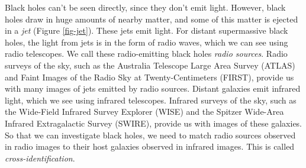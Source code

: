 \documentclass[a4paper]{article}
\begin{document}
        Black holes can't be seen directly, since they don't emit light. However, black holes draw in huge amounts of nearby matter, and some of this matter is ejected in a \emph{jet} (Figure \ref{fig-jet}). These jets emit light. For distant supermassive black holes, the light from jets is in the form of radio waves, which we can see using radio telescopes. We call these radio-emitting black holes \emph{radio sources}. Radio surveys of the sky, such as the Australia Telescope Large Area Survey (ATLAS)\cite{norris06} and Faint Images of the Radio Sky at Twenty-Centimeters (FIRST)\cite{becker95}, provide us with many images of jets emitted by radio sources. Distant galaxies emit infrared light, which we see using infrared telescopes. Infrared surveys of the sky, such as the Wide-Field Infrared Survey Explorer (WISE)\cite{wright10} and the Spitzer Wide-Area Infrared Extragalactic Survey (SWIRE)\cite{lonsdale03}, provide us with images of these galaxies. So that we can investigate black holes, we need to match radio sources observed in radio images to their host galaxies observed in infrared images. This is called \emph{cross-identification}.
\end{document}
